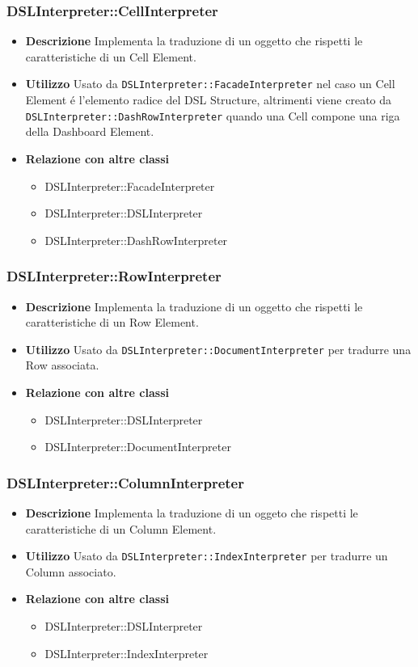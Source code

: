 \subsubsection{DSLInterpreter::CellInterpreter}
\begin{itemize}
\item \textbf{Descrizione}
Implementa la traduzione di un oggetto che rispetti le caratteristiche di un Cell Element.
\item \textbf{Utilizzo}
Usato da \texttt{DSLInterpreter::FacadeInterpreter} nel caso un Cell Element \'e l'elemento radice del DSL Structure, altrimenti viene creato da \texttt{DSLInterpreter::DashRowInterpreter} quando una Cell compone una riga della Dashboard Element.
\item \textbf{Relazione con altre classi}
\begin{itemize}
\item DSLInterpreter::FacadeInterpreter
\item DSLInterpreter::DSLInterpreter
\item DSLInterpreter::DashRowInterpreter
\end{itemize}
\end{itemize}

\subsubsection{DSLInterpreter::RowInterpreter}
\begin{itemize}
\item \textbf{Descrizione}
Implementa la traduzione di un oggetto che rispetti le caratteristiche di un Row Element.
\item \textbf{Utilizzo}
Usato da \texttt{DSLInterpreter::DocumentInterpreter} per tradurre una Row associata.
\item \textbf{Relazione con altre classi}  
\begin{itemize}
\item DSLInterpreter::DSLInterpreter
\item DSLInterpreter::DocumentInterpreter
\end{itemize}
\end{itemize}

\subsubsection{DSLInterpreter::ColumnInterpreter}
\begin{itemize}
\item \textbf{Descrizione}
Implementa la traduzione di un oggeto che rispetti le caratteristiche di un Column Element.
\item \textbf{Utilizzo}
Usato da \texttt{DSLInterpreter::IndexInterpreter} per tradurre un Column associato.
\item \textbf{Relazione con altre classi}
\begin{itemize}
\item DSLInterpreter::DSLInterpreter
\item DSLInterpreter::IndexInterpreter
\end{itemize}
\end{itemize}

